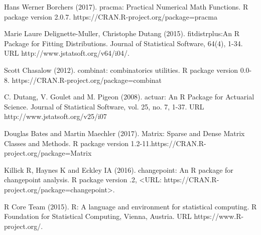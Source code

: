 \begin{thebibliography}{00}
Hans Werner Borchers (2017). 
\newblock pracma: Practical Numerical Math Functions. 
\newblock R package version 2.0.7. https://CRAN.R-project.org/package=pracma

Marie Laure Delignette-Muller, Christophe Dutang (2015). 
\newblock fitdistrplus:An R Package for Fitting Distributions. 
\newblock Journal of Statistical Software, 64(4), 1-34. URL http://www.jstatsoft.org/v64/i04/.

 Scott Chasalow (2012). 
\newblock combinat: combinatorics utilities. 
\newblock R package version 0.0-8. https://CRAN.R-project.org/package=combinat

 C. Dutang, V. Goulet and M. Pigeon (2008). 
\newblock actuar: An R Package for Actuarial Science. 
\newblock Journal of Statistical Software, vol. 25, no. 7, 1-37. URL http://www.jstatsoft.org/v25/i07

 Douglas Bates and Martin Maechler (2017). 
\newblock Matrix: Sparse and Dense Matrix Classes and Methods. 
\newblock R package version 1.2-11.https://CRAN.R-project.org/package=Matrix

 Killick R, Haynes K and Eckley IA (2016).
\newblock changepoint: An R package for changepoint analysis. R package version
.2, <URL: https://CRAN.R-project.org/package=changepoint>.

R Core Team (2015). 
\newblock R: A language and environment for statistical computing. R Foundation for Statistical Computing, Vienna, Austria.
\newblock URL https://www.R-project.org/.

\end{thebibliography}

